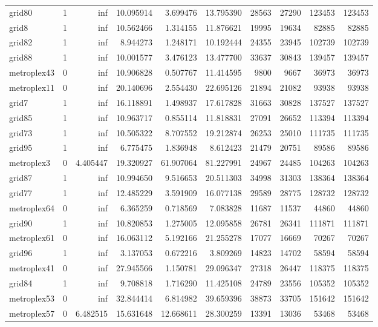 \begin{longtable}{|l|r|r|r|r|r|r|r|r|r|}
grid80 & 1 & inf & 10.095914 & 3.699476 & 13.795390 & 28563 & 27290 & 123453 & 123453 \\
grid8 & 1 & inf & 10.562466 & 1.314155 & 11.876621 & 19995 & 19634 & 82885 & 82885 \\
grid82 & 1 & inf & 8.944273 & 1.248171 & 10.192444 & 24355 & 23945 & 102739 & 102739 \\
grid88 & 1 & inf & 10.001577 & 3.476123 & 13.477700 & 33637 & 30843 & 139457 & 139457 \\
metroplex43 & 0 & inf & 10.906828 & 0.507767 & 11.414595 & 9800 & 9667 & 36973 & 36973 \\
metroplex11 & 0 & inf & 20.140696 & 2.554430 & 22.695126 & 21894 & 21082 & 93938 & 93938 \\
grid7 & 1 & inf & 16.118891 & 1.498937 & 17.617828 & 31663 & 30828 & 137527 & 137527 \\
grid85 & 1 & inf & 10.963717 & 0.855114 & 11.818831 & 27091 & 26652 & 113394 & 113394 \\
grid73 & 1 & inf & 10.505322 & 8.707552 & 19.212874 & 26253 & 25010 & 111735 & 111735 \\
grid95 & 1 & inf & 6.775475 & 1.836948 & 8.612423 & 21479 & 20751 & 89586 & 89586 \\
metroplex3 & 0 & 4.405447 & 19.320927 & 61.907064 & 81.227991 & 24967 & 24485 & 104263 & 104263 \\
grid87 & 1 & inf & 10.994650 & 9.516653 & 20.511303 & 34998 & 31303 & 138364 & 138364 \\
grid77 & 1 & inf & 12.485229 & 3.591909 & 16.077138 & 29589 & 28775 & 128732 & 128732 \\
metroplex64 & 0 & inf & 6.365259 & 0.718569 & 7.083828 & 11687 & 11537 & 44860 & 44860 \\
grid90 & 1 & inf & 10.820853 & 1.275005 & 12.095858 & 26781 & 26341 & 111871 & 111871 \\
metroplex61 & 0 & inf & 16.063112 & 5.192166 & 21.255278 & 17077 & 16669 & 70267 & 70267 \\
grid96 & 1 & inf & 3.137053 & 0.672216 & 3.809269 & 14823 & 14702 & 58594 & 58594 \\
metroplex41 & 0 & inf & 27.945566 & 1.150781 & 29.096347 & 27318 & 26447 & 118375 & 118375 \\
grid84 & 1 & inf & 9.708818 & 1.716290 & 11.425108 & 24789 & 23556 & 105352 & 105352 \\
metroplex53 & 0 & inf & 32.844414 & 6.814982 & 39.659396 & 38873 & 33705 & 151642 & 151642 \\
metroplex57 & 0 & 6.482515 & 15.631648 & 12.668611 & 28.300259 & 13391 & 13036 & 53468 & 53468 \\

\end{longtable}
